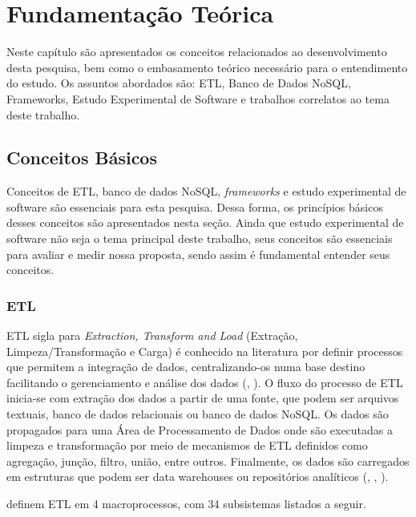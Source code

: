 \chapter{Fundamentação Teórica}

Neste capítulo são apresentados os conceitos relacionados ao desenvolvimento desta pesquisa, bem como o embasamento teórico necessário para o entendimento do estudo. Os assuntos abordados são: ETL, Banco de Dados NoSQL, Frameworks, Estudo Experimental de Software e trabalhos correlatos ao tema deste trabalho.


\clearpage

\section{Conceitos Básicos}

Conceitos de ETL, banco de dados NoSQL, \textit{frameworks} e estudo experimental de software são essenciais para esta pesquisa. Dessa forma, os princípios básicos desses conceitos são apresentados nesta seção. Ainda que estudo experimental de software não seja o tema principal deste trabalho, seus conceitos são essenciais para avaliar e medir nossa proposta, sendo assim é fundamental entender seus conceitos.

\subsection{ETL}

ETL sigla para \textit{Extraction, Transform and Load} (Extração, Limpeza/Transformação e Carga) é conhecido na literatura por definir processos que permitem a integração de dados, centralizando-os numa base destino facilitando o gerenciamento e análise dos dados (\cite{kimball:2004}, \cite{rud:2009}). O fluxo do processo de ETL inicia-se com extração dos dados a partir de uma fonte, que podem ser arquivos textuais, banco de dados relacionais ou banco de dados NoSQL. Os dados são propagados para uma Área de Processamento de Dados onde são executadas a limpeza e transformação por meio de mecanismos de ETL definidos como agregação, junção, filtro, união, entre outros. Finalmente, os dados são carregados em estruturas que podem ser data warehouses ou repositórios analíticos (\cite{silva:2016}, \cite{silva:2012}, \cite{kimball:2004}). 

\cite{kimball:2004} definem ETL em 4 macroprocessos, com 34 subsistemas listados a seguir. 

